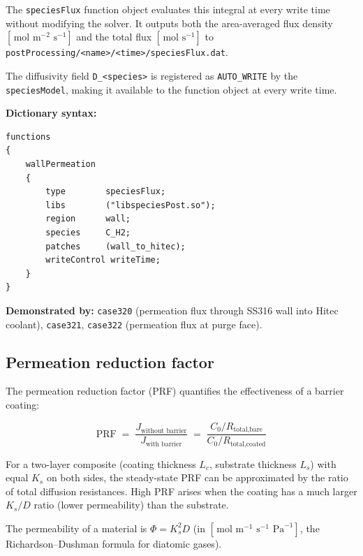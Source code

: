 \documentclass[11pt,a4paper]{article}
\newcommand{\mol}{\,\text{mol}}
\newcommand{\m}{\,\text{m}}
\newcommand{\s}{\,\text{s}}
\newcommand{\Pa}{\,\text{Pa}}
\newcommand{\caseref}[1]{\texttt{\color{casegreen}#1}}
\begin{document}
The \texttt{speciesFlux} function object evaluates this integral at every
write time without modifying the solver.  It outputs both the area-averaged
flux density $[\mol\,\m^{-2}\,\s^{-1}]$ and the total flux $[\mol\,\s^{-1}]$
to \texttt{postProcessing/<name>/<time>/speciesFlux.dat}.

The diffusivity field \texttt{D\_<species>} is registered as
\texttt{AUTO\_WRITE} by the \texttt{speciesModel}, making it available to
the function object at every write time.

\textbf{Dictionary syntax:}
\begin{verbatim}
functions
{
    wallPermeation
    {
        type        speciesFlux;
        libs        ("libspeciesPost.so");
        region      wall;
        species     C_H2;
        patches     (wall_to_hitec);
        writeControl writeTime;
    }
}
\end{verbatim}

\begin{tcolorbox}[casebox]
  \textbf{Demonstrated by:} \caseref{case320}
  (permeation flux through SS316 wall into Hitec coolant),
  \caseref{case321}, \caseref{case322} (permeation flux at purge face).
\end{tcolorbox}

\subsection{Permeation reduction factor}
\label{sec:prf}

The permeation reduction factor (PRF) quantifies the effectiveness of a
barrier coating:

\begin{tcolorbox}[eqbox,title={Permeation reduction factor}]
\begin{equation}\label{eq:prf}
  \mathrm{PRF}
  \;=\;
  \frac{J_\text{without barrier}}{J_\text{with barrier}}
  \;=\;
  \frac{C_0/R_\text{total,bare}}{C_0/R_\text{total,coated}}
\end{equation}
\end{tcolorbox}

For a two-layer composite (coating thickness $L_c$, substrate thickness
$L_s$) with equal $K_s$ on both sides, the steady-state PRF can be
approximated by the ratio of total diffusion resistances.  High PRF arises
when the coating has a much larger $K_s/D$ ratio (lower permeability) than
the substrate.

The permeability of a material is $\Phi = K_s^2 D$ (in
$[\mol\,\m^{-1}\,\s^{-1}\,\Pa^{-1}]$, the Richardson--Dushman formula for
diatomic gases).
\end{document}
